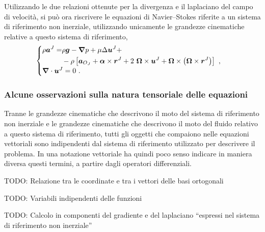 Utilizzando le due relazioni ottenute per la divergenza e il laplaciano del campo di velocità, si può ora riscrivere le equazioni di Navier--Stokes riferite a un sistema di riferimento non inerziale, utilizzando unicamente le grandezze cinematiche relative a questo sistema di riferimento,
\begin{equation}
\begin{cases}
\begin{aligned}
 \rho \bm{a}^J = &  \rho \bm{g} - \bm{\nabla} p + \mu \Delta \bm{u}^J + \\
               & - \rho \left[
   \bm{a}_{O_J} + \bm{\alpha} \times \bm{r}^J + 2~\bm{\Omega} \times \bm{u}^J + 
   \bm{\Omega} \times \left( \bm{\Omega} \times \bm{r}^J \right) 
             \right] \ ,
\end{aligned} \\
\bm{\nabla} \cdot \bm{u}^J = 0 \ .
\end{cases}
\end{equation}

\subsubsection{Alcune osservazioni sulla natura tensoriale delle equazioni}
{\color{red} Tranne le grandezze cinematiche che descrivono il moto del sistema di riferimento non inerziale e le grandezze cinematiche che descrivono il moto del fluido relativo a questo sistema di riferimento, tutti gli oggetti che compaiono nelle equazioni vettoriali sono indipendenti dal sistema di riferimento utilizzato per descrivere il problema. In una notazione vettoriale ha quindi poco senso indicare in maniera diversa questi termini, a partire dagli operatori differenziali.

TODO: Relazione tra le coordinate e tra i vettori delle basi ortogonali

TODO: Variabili indipendenti delle funzioni

TODO: Calcolo in componenti del gradiente e del laplaciano ``espressi nel sistema di riferimento non inerziale''

}

